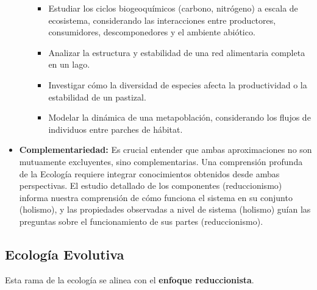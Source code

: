 \documentclass[
]{book}
\providecommand{\tightlist}{%
  \setlength{\itemsep}{0pt}\setlength{\parskip}{0pt}}
\begin{document}
\begin{itemize}
\begin{itemize}
    \begin{itemize}
    \tightlist
    \item
      Estudiar los ciclos biogeoquímicos (carbono, nitrógeno) a escala de ecosistema, considerando las interacciones entre productores, consumidores, descomponedores y el ambiente abiótico.
    \item
      Analizar la estructura y estabilidad de una red alimentaria completa en un lago.
    \item
      Investigar cómo la diversidad de especies afecta la productividad o la estabilidad de un pastizal.
    \item
      Modelar la dinámica de una metapoblación, considerando los flujos de individuos entre parches de hábitat.
    \end{itemize}
  \end{itemize}
\item
  \textbf{Complementariedad:} Es crucial entender que ambas aproximaciones no son mutuamente excluyentes, sino complementarias. Una comprensión profunda de la Ecología requiere integrar conocimientos obtenidos desde ambas perspectivas. El estudio detallado de los componentes (reduccionismo) informa nuestra comprensión de cómo funciona el sistema en su conjunto (holismo), y las propiedades observadas a nivel de sistema (holismo) guían las preguntas sobre el funcionamiento de sus partes (reduccionismo).
\end{itemize}

\subsection*{\texorpdfstring{\textbf{Ecología Evolutiva}}{Ecología Evolutiva}}\label{ecoevo}

Esta rama de la ecología se alinea con el \textbf{enfoque reduccionista}.
\end{document}
